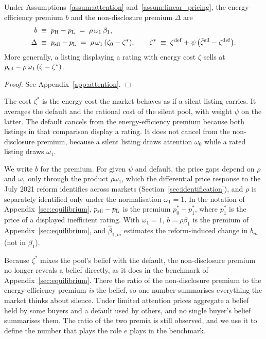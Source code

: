 \begin{lemma}
\label{lem:att_prices}
Under Assumptions~\ref{assum:attention} and~\ref{assum:linear_pricing}, the energy-efficiency premium $b$ and the non-disclosure premium $\Delta$ are
\begin{align}
    b&\;\equiv\;p_{\rm H}-p_{\rm L}\;=\;\rho\,\omega_1\,\beta_1, \label{eq:b_att}\\
    \Delta&\;\equiv\;p_{\rm sil}-p_{\rm L}\;=\;\rho\,\omega_1\,(\zeta_0-\zeta^*),\qquad \zeta^*\;\equiv\;\zeta^{\rm def}+\psi\,\big(\bar \zeta^{\rm sil}-\zeta^{\rm def}\big). \label{eq:premium_att}
\end{align}
More generally, a listing displaying a rating with energy cost $\zeta$ sells at $p_{\rm sil}-\rho\,\omega_1\,(\zeta-\zeta^*)$.
\end{lemma}

\noindent\textit{Proof.} See Appendix~\ref{app:attention}. $\Box$

The cost $\zeta^*$ is the energy cost the market behaves as if a silent listing carries. It averages the default and the rational cost of the silent pool, with weight $\psi$ on the latter. The default cancels from the energy-efficiency premium because both listings in that comparison display a rating. It does not cancel from the non-disclosure premium, because a silent listing draws attention $\omega_0$ while a rated listing draws $\omega_1$.

We write $b$ for the premium. For given $\psi$ and default, the price gaps depend on $\rho$ and $\omega_1$ only through the product $\rho\omega_1$, which the differential price response to the July 2021 reform identifies across markets (Section~\ref{sec:identification}), and $\rho$ is separately identified only under the normalisation $\omega_1=1$. In the notation of Appendix~\ref{sec:equilibrium}, $p_{\rm sil}-p_{\rm L}$ is the premium $p_0^*-p_1^*$, where $p_1^*$ is the price of a displayed inefficient rating. With $\omega_1=1$, $b=\rho\beta_1$ is the premium of Appendix~\ref{sec:equilibrium}, and $\hat\beta_{1,m}$ estimates the reform-induced change in $b_m$ (not in $\beta_1$).

Because $\zeta^*$ mixes the pool's belief with the default, the non-disclosure premium no longer reveals a belief directly, as it does in the benchmark of Appendix~\ref{sec:equilibrium}. There the ratio of the non-disclosure premium to the energy-efficiency premium \emph{is} the belief, so one number summarises everything the market thinks about silence. Under limited attention prices aggregate a belief held by some buyers and a default used by others, and no single buyer's belief summarises them. The ratio of the two premia is still observed, and we use it to define the number that plays the role $e$ plays in the benchmark.

